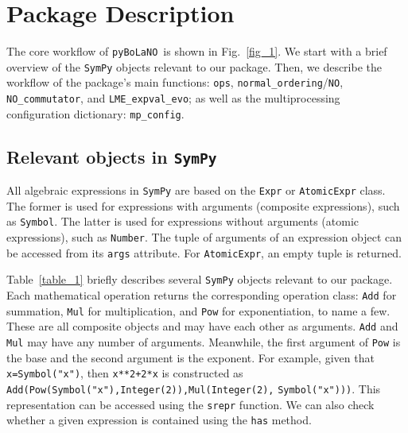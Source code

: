 \documentclass[5p, twocolumn, 10pt, sort&compress]{elsarticle}
\newcommand{\inlinecode}[1]{\texttt{#1}}
\newcommand{\pybolano}{\texttt{pyBoLaNO}~}
\begin{document}

\section{Package Description}\label{section:package_anatomy}

The core workflow of \pybolano is shown in Fig.~\ref{fig_1}. We start with a brief overview of the \texttt{SymPy} objects relevant to our package. Then, we describe the workflow of the package's main functions: \inlinecode{ops}, \inlinecode{normal_ordering}/\inlinecode{NO}, \inlinecode{NO_commutator}, and \inlinecode{LME_expval_evo}; as well as the multiprocessing configuration dictionary: \inlinecode{mp_config}.

\subsection{Relevant objects in \texttt{SymPy}}
\label{subsec_sympy_objects}

All algebraic expressions in \texttt{SymPy} are based on the \inlinecode{Expr} or \inlinecode{AtomicExpr} class. The former is used for expressions with arguments (composite expressions), such as \inlinecode{Symbol}. The latter is used for expressions without arguments (atomic expressions), such as \inlinecode{Number}. The tuple of arguments of an expression object can be accessed from its \inlinecode{args} attribute.  For \inlinecode{AtomicExpr}, an empty tuple is returned.

Table~\ref{table_1} briefly describes several \texttt{SymPy} objects relevant to our package. Each mathematical operation returns the corresponding operation class: \inlinecode{Add} for summation, \inlinecode{Mul} for multiplication, and \inlinecode{Pow} for exponentiation, to name a few. These are all composite objects and may have each other as arguments. \inlinecode{Add} and \inlinecode{Mul} may have any number of arguments. Meanwhile, the first argument of \inlinecode{Pow} is the base and the second argument is the exponent.  For example, given that \inlinecode{x=Symbol("x")}, then \inlinecode{x**2+2*x} is constructed as \inlinecode{Add(Pow(Symbol("x"),Integer(2)),Mul(Integer(2),} \inlinecode{Symbol("x")))}. This representation can be accessed using the \inlinecode{srepr} function. We can also check whether a given expression is contained using the \inlinecode{has} method.
\end{document}
